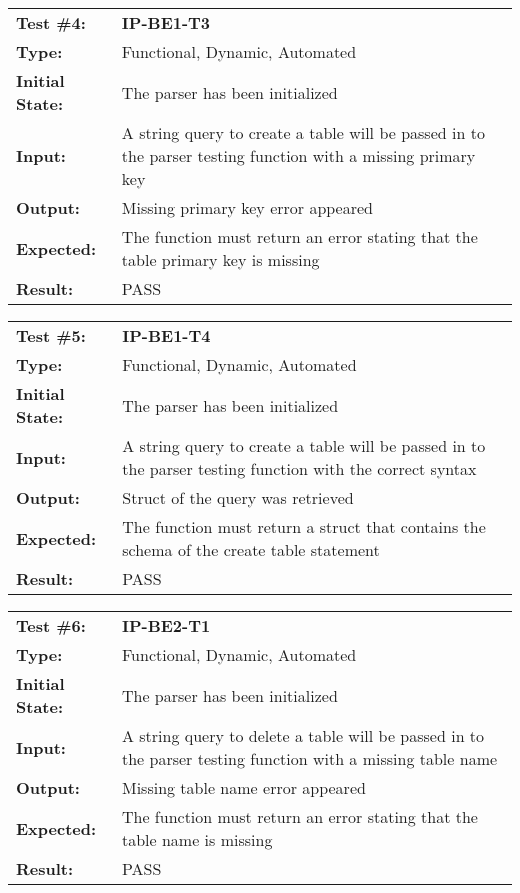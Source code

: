 \documentclass[12pt, titlepage]{article}
\begin{document}
\begin{mdframed}[linewidth=1pt]
\begin{tabularx}{\textwidth}{@{}p{3cm}X@{}}
{\bf Test \#4:} & {\bf IP-BE1-T3}\\[\baselineskip]
{\bf Type:} & Functional, Dynamic, Automated \\[0.5\baselineskip]
{\bf Initial State:} & The parser has been initialized \\[\baselineskip]
{\bf Input:} & A string query to create a table will be passed in to the parser testing function with a missing primary key\\[\baselineskip]
{\bf Output:} & Missing primary key error appeared \\[\baselineskip]
{\bf Expected:} & The function must return an error stating that the table primary key is missing \\[\baselineskip]
{\bf Result:} & PASS
\end{tabularx}
\end{mdframed}

\begin{mdframed}[linewidth=1pt]
\begin{tabularx}{\textwidth}{@{}p{3cm}X@{}}
{\bf Test \#5:} & {\bf IP-BE1-T4}\\[\baselineskip]
{\bf Type:} & Functional, Dynamic, Automated \\[0.5\baselineskip]
{\bf Initial State:} & The parser has been initialized \\[\baselineskip]
{\bf Input:} & A string query to create a table will be passed in to the parser testing function with the correct syntax \\[\baselineskip]
{\bf Output:} & Struct of the query was retrieved \\[\baselineskip]
{\bf Expected:} & The function must return a struct that contains the schema of the create table statement \\[\baselineskip]
{\bf Result:} & PASS
\end{tabularx}
\end{mdframed}

\begin{mdframed}[linewidth=1pt]
\begin{tabularx}{\textwidth}{@{}p{3cm}X@{}}
{\bf Test \#6:} & {\bf IP-BE2-T1}\\[\baselineskip]
{\bf Type:} & Functional, Dynamic, Automated \\[0.5\baselineskip]
{\bf Initial State:} & The parser has been initialized \\[\baselineskip]
{\bf Input:} & A string query to delete a table will be passed in to the parser testing function with a missing table name \\[\baselineskip]
{\bf Output:} & Missing table name error appeared \\[\baselineskip]
{\bf Expected:} & The function must return an error stating that the table name is missing \\[\baselineskip]
{\bf Result:} & PASS
\end{tabularx}
\end{mdframed}
\end{document}

